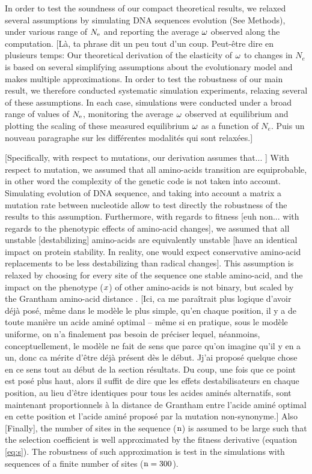 \documentclass{article}
\begin{document}
	In order to test the soundness of our compact theoretical results, we relaxed several assumptions by simulating DNA sequences evolution (See Methods), under various range of $N_{\mathrm{e}}$ and reporting the average $\omega$ observed along the computation. [Là, ta phrase dit un peu tout d'un coup. Peut-être dire en plusieurs temps: Our theoretical derivation of the elasticity of $\omega$ to changes in $N_e$ is based on several simplifying assumptions about the evolutionary model and makes multiple approximations. In order to test the robustness of our main result, we therefore conducted systematic simulation experiments, relaxing several of these assumptions. In each case, simulations were conducted under a broad range of values of $N_{\mathrm{e}}$, monitoring the average $\omega$ observed at equilibrium and plotting the scaling of these measured equilibrium $\omega$ as a function of $N_e$. Puis un nouveau paragraphe sur les différentes modalités qui sont relaxées.]
	
	[Specifically, with respect to mutations, our derivation assumes that... ]
	With respect to mutation, we assumed that all amino-acids transition are equiprobable, in other word the complexity of the genetic code is not taken into account.
	Simulating evolution of DNA sequence, and taking into account a matrix a mutation rate between nucleotide allow to test directly the robustness of the results to this assumption.
	Furthermore, with regards to fitness [euh non... with regards to the phenotypic effects of amino-acid changes], we assumed that all unstable [destabilizing] amino-acids are equivalently unstable [have an identical impact on protein stability. In reality, one would expect conservative amino-acid replacements to be less destabilizing than radical changes].
	This assumption is relaxed by choosing for every site of the sequence one stable amino-acid, and the impact on the phenotype ($x$) of other amino-acids is not binary, but scaled by the Grantham amino-acid distance \cite{Grantham1974}. [Ici, ca me paraîtrait plus logique d'avoir déjà posé, même dans le modèle le plus simple, qu'en chaque position, il y a de toute manière un acide aminé optimal -- même si en pratique, sous le modèle uniforme, on n'a finalement pas besoin de préciser lequel, néanmoins, conceptuellement, le modèle ne fait de sens que parce qu'on imagine qu'il y en a un, donc ca mérite d'être déjà présent dès le début. Jj'ai proposé quelque chose en ce sens tout au début de la section résultats. Du coup, une fois que ce point est posé plus haut, alors il suffit de dire que les effets destabilisateurs en chaque position, au lieu d'être identiques pour tous les acides aminés alternatifs, sont maintenant proportionnels à la distance de Grantham entre l'acide aminé optimal en cette position et l'acide aminé proposé par la mutation non-synonyme.]
	Also [Finally], the number of sites in the sequence ($\text{n}$) is assumed to be large such that the selection coefficient is well approximated by the fitness derivative (equation \ref{eq:s}).
	The robustness of such approximation is test in the simulations with sequences of a finite number of sites ($\text{n}=300$).\\
	
\end{document}
